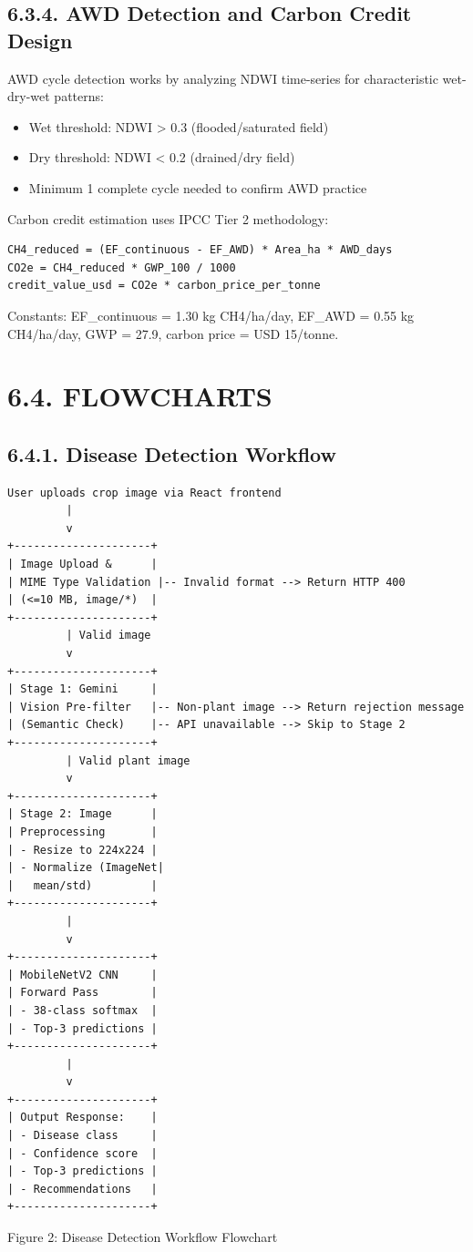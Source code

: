 \documentclass[12pt, a4paper]{report}
\begin{document}
\subsection{6.3.4. AWD Detection and Carbon Credit Design}
AWD cycle detection works by analyzing NDWI time-series for characteristic wet-dry-wet patterns:

\begin{itemize}[leftmargin=*]
  \item Wet threshold: NDWI > 0.3 (flooded/saturated field)
  \item Dry threshold: NDWI < 0.2 (drained/dry field)
  \item Minimum 1 complete cycle needed to confirm AWD practice
\end{itemize}
Carbon credit estimation uses IPCC Tier 2 methodology:

\begin{Verbatim}[fontsize=\small]
CH4_reduced = (EF_continuous - EF_AWD) * Area_ha * AWD_days
CO2e = CH4_reduced * GWP_100 / 1000
credit_value_usd = CO2e * carbon_price_per_tonne
\end{Verbatim}
Constants: EF\_continuous = 1.30 kg CH4/ha/day, EF\_AWD = 0.55 kg CH4/ha/day, GWP = 27.9, carbon price = USD 15/tonne.

\section{6.4. FLOWCHARTS}
\subsection{6.4.1. Disease Detection Workflow}
\begin{Verbatim}[fontsize=\small]
User uploads crop image via React frontend
         |
         v
+---------------------+
| Image Upload &      |
| MIME Type Validation |-- Invalid format --> Return HTTP 400
| (<=10 MB, image/*)  |
+---------------------+
         | Valid image
         v
+---------------------+
| Stage 1: Gemini     |
| Vision Pre-filter   |-- Non-plant image --> Return rejection message
| (Semantic Check)    |-- API unavailable --> Skip to Stage 2
+---------------------+
         | Valid plant image
         v
+---------------------+
| Stage 2: Image      |
| Preprocessing       |
| - Resize to 224x224 |
| - Normalize (ImageNet|
|   mean/std)         |
+---------------------+
         |
         v
+---------------------+
| MobileNetV2 CNN     |
| Forward Pass        |
| - 38-class softmax  |
| - Top-3 predictions |
+---------------------+
         |
         v
+---------------------+
| Output Response:    |
| - Disease class     |
| - Confidence score  |
| - Top-3 predictions |
| - Recommendations   |
+---------------------+
\end{Verbatim}
Figure 2: Disease Detection Workflow Flowchart
\end{document}
